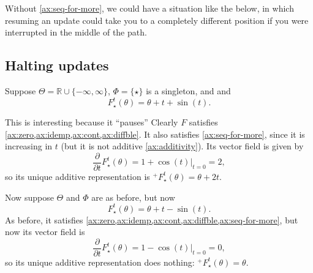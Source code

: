 Without \cref{ax:seq-for-more}, we could have a situation like the below,
in which resuming an update could take you to a completely different position
if you were interrupted in the middle of the path. 

\begin{center}
\end{center}


\subsection{Halting updates}

\begin{example}
Suppose $\Theta = \mathbb R \cup \{-\infty, \infty\}$, $\Phi = \{\star\}$ is a singleton, and
and 
\[
    F^t_{\!\star}(\theta) = \theta + t + \sin(t).
\]

This is interesting because it ``pauses'' 
Clearly $F$ satisfies \cref{ax:zero,ax:idemp,ax:cont,ax:diffble}.
It also satisfies \cref{ax:seq-for-more}, since it is increasing in $t$
(but it is not additive \cref{ax:additivity}).
%
Its vector field is given by 
\[
    \frac{\partial}{\partial t} F^t_{\!\star}(\theta) = 1 + \cos(t) \Big|_{t=0}
     = 2,
\]
so its unique additive representation is
$
    {^+}F^t_{\!\star}(\theta) = \theta + 2 t.
$
\end{example}

\begin{example}
Now suppose $\Theta$ and $\Phi$ are as before,
but now
\[
    F^t_{\!\star}(\theta) = \theta + t - \sin(t).
\]
As before, it satisfies \cref{ax:zero,ax:idemp,ax:cont,ax:diffble,ax:seq-for-more},
but now its vector field is
\[
    \frac{\partial}{\partial t} F^t_{\!\star}(\theta) = 1 - \cos(t) \Big|_{t=0}
     = 0,
\]
so its unique additive representation does nothing:
$
    {^+}F^t_{\!\star}(\theta) = \theta. 
$
\end{example}
